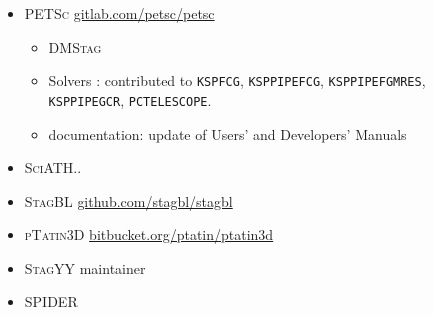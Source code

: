 \begin{itemize}
\item \textsc{PETSc} \href{https://gitlab.com/petsc/petsc}{gitlab.com/petsc/petsc}
\begin{itemize}
\item \textsc{DMStag}
\item Solvers : contributed to \lstinline{KSPFCG}, \lstinline{KSPPIPEFCG}, \lstinline{KSPPIPEFGMRES}, \lstinline{KSPPIPEGCR}, \lstinline{PCTELESCOPE}.
\item documentation: update of Users' and Developers' Manuals
\end{itemize}
\item \textsc{SciATH}..
\item \textsc{StagBL} \href{https://github.com/stagbl/stagbl}{github.com/stagbl/stagbl}
\item \textsc{pTatin3D} \href{https://bitbucket.org/ptatin/ptatin3d}{bitbucket.org/ptatin/ptatin3d}
\item \textsc{StagYY}  maintainer
\item \textsc{SPIDER}
\end{itemize}
